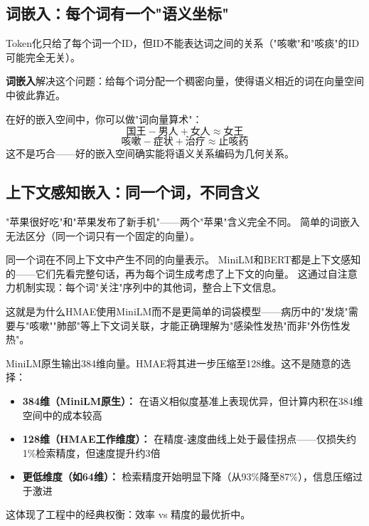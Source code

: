 \documentclass[11pt,a4paper]{ctexart}
\begin{document}
\subsection{词嵌入：每个词有一个"语义坐标"}

Token化只给了每个词一个ID，但ID不能表达词之间的关系（"咳嗽"和"咳痰"的ID可能完全无关）。

\textbf{词嵌入}解决这个问题：给每个词分配一个稠密向量，使得语义相近的词在向量空间中彼此靠近。

\begin{exambox}[词嵌入空间中的有趣现象]
在好的嵌入空间中，你可以做"词向量算术"：
$$\text{国王} - \text{男人} + \text{女人} \approx \text{女王}$$
$$\text{咳嗽} - \text{症状} + \text{治疗} \approx \text{止咳药}$$
这不是巧合——好的嵌入空间确实能将语义关系编码为几何关系。
\end{exambox}

\subsection{上下文感知嵌入：同一个词，不同含义}

"苹果很好吃"和"苹果发布了新手机"——两个"苹果"含义完全不同。
简单的词嵌入无法区分（同一个词只有一个固定的向量）。

\begin{defbox}
同一个词在不同上下文中产生不同的向量表示。
MiniLM和BERT都是上下文感知的——它们先看完整句话，再为每个词生成考虑了上下文的向量。
这通过自注意力机制实现：每个词"关注"序列中的其他词，整合上下文信息。
\end{defbox}

这就是为什么HMAE使用MiniLM而不是更简单的词袋模型——病历中的"发烧"需要与"咳嗽""肺部"等上下文词关联，才能正确理解为"感染性发热"而非"外伤性发热"。

\begin{deepbox}
MiniLM原生输出384维向量。HMAE将其进一步压缩至128维。这不是随意的选择：
\begin{itemize}[nosep]
\item \textbf{384维（MiniLM原生）：} 在语义相似度基准上表现优异，但计算内积在384维空间中的成本较高
\item \textbf{128维（HMAE工作维度）：} 在精度-速度曲线上处于最佳拐点——仅损失约1\%检索精度，但速度提升约3倍
\item \textbf{更低维度（如64维）：} 检索精度开始明显下降（从93\%降至87\%），信息压缩过于激进
\end{itemize}
这体现了工程中的经典权衡：效率 vs 精度的最优折中。
\end{deepbox}
\end{document}
